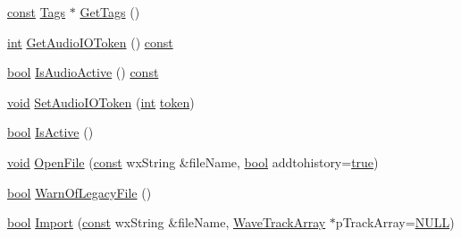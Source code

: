 \begin{DoxyCompactItemize}
\item 
\hyperlink{getopt1_8c_a2c212835823e3c54a8ab6d95c652660e}{const} \hyperlink{class_tags}{Tags} $\ast$ \hyperlink{class_audacity_project_abc6fde5083cc3580569a81063fe6c6e8}{Get\+Tags} ()
\item 
\hyperlink{xmltok_8h_a5a0d4a5641ce434f1d23533f2b2e6653}{int} \hyperlink{class_audacity_project_a0c43e740f2b1e8f08d1d74bf38fd8abd}{Get\+Audio\+I\+O\+Token} () \hyperlink{getopt1_8c_a2c212835823e3c54a8ab6d95c652660e}{const} 
\item 
\hyperlink{mac_2config_2i386_2lib-src_2libsoxr_2soxr-config_8h_abb452686968e48b67397da5f97445f5b}{bool} \hyperlink{class_audacity_project_a393f7f316ce766e73323d1c92d0b496e}{Is\+Audio\+Active} () \hyperlink{getopt1_8c_a2c212835823e3c54a8ab6d95c652660e}{const} 
\item 
\hyperlink{sound_8c_ae35f5844602719cf66324f4de2a658b3}{void} \hyperlink{class_audacity_project_a82a9634b37418bbd1181f81a47f75e7e}{Set\+Audio\+I\+O\+Token} (\hyperlink{xmltok_8h_a5a0d4a5641ce434f1d23533f2b2e6653}{int} \hyperlink{seqread_8c_a472e2484c39e6e56a4c486a7d779841d}{token})
\item 
\hyperlink{mac_2config_2i386_2lib-src_2libsoxr_2soxr-config_8h_abb452686968e48b67397da5f97445f5b}{bool} \hyperlink{class_audacity_project_a7458869eb7c6f3a785d31844e848bd1f}{Is\+Active} ()
\item 
\hyperlink{sound_8c_ae35f5844602719cf66324f4de2a658b3}{void} \hyperlink{class_audacity_project_a967e90b06c1c965d7f7d4b8cbd32dc76}{Open\+File} (\hyperlink{getopt1_8c_a2c212835823e3c54a8ab6d95c652660e}{const} wx\+String \&file\+Name, \hyperlink{mac_2config_2i386_2lib-src_2libsoxr_2soxr-config_8h_abb452686968e48b67397da5f97445f5b}{bool} addtohistory=\hyperlink{mac_2config_2i386_2lib-src_2libsoxr_2soxr-config_8h_a41f9c5fb8b08eb5dc3edce4dcb37fee7}{true})
\item 
\hyperlink{mac_2config_2i386_2lib-src_2libsoxr_2soxr-config_8h_abb452686968e48b67397da5f97445f5b}{bool} \hyperlink{class_audacity_project_a4c554aecb92911298234ec199f46a1c8}{Warn\+Of\+Legacy\+File} ()
\item 
\hyperlink{mac_2config_2i386_2lib-src_2libsoxr_2soxr-config_8h_abb452686968e48b67397da5f97445f5b}{bool} \hyperlink{class_audacity_project_a73b94671ab2ff3e89391d7a0bcc91d3a}{Import} (\hyperlink{getopt1_8c_a2c212835823e3c54a8ab6d95c652660e}{const} wx\+String \&file\+Name, \hyperlink{class_wave_track_array}{Wave\+Track\+Array} $\ast$p\+Track\+Array=\hyperlink{px__mixer_8h_a070d2ce7b6bb7e5c05602aa8c308d0c4}{N\+U\+LL})
\item 

\end{DoxyCompactItemize}
